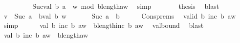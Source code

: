 \begin{isabellebody}
\ \ \ \ \isamarkupfalse%
\ \isamarkupfalse%
\ {\isachardoublequoteopen}{\isachardot}{\kern0pt}{\isachardot}{\kern0pt}{\isachardot}{\kern0pt}\ {\isacharequal}{\kern0pt}\ Suc{\isacharparenleft}{\kern0pt}val\ b\ {\isacharparenleft}{\kern0pt}a\ {\isacharhash}{\kern0pt}\ w{\isacharparenright}{\kern0pt}{\isacharparenright}{\kern0pt}\ mod\ {\isacharparenleft}{\kern0pt}b{\isacharcircum}{\kern0pt}length{\isacharparenleft}{\kern0pt}a{\isacharhash}{\kern0pt}w{\isacharparenright}{\kern0pt}{\isacharparenright}{\kern0pt}{\isachardoublequoteclose}\ \isamarkupfalse%
\ simp\isanewline
\ \ \ \ \isamarkupfalse%
\ \isamarkupfalse%
\ {\isacharquery}{\kern0pt}thesis\ \isamarkupfalse%
\ blast\isanewline
\ \ \isamarkupfalse%
\isanewline
\ \ \ \ \isamarkupfalse%
\ {\isacharquery}{\kern0pt}v\ {\isacharequal}{\kern0pt}\ {\isachardoublequoteopen}Suc\ a\ {\isacharplus}{\kern0pt}\ b{\isacharasterisk}{\kern0pt}val\ b\ w{\isachardoublequoteclose}\isanewline
\ \ \ \ \isamarkupfalse%
\ {}{\isacharcolon}{\kern0pt}\ {\isachardoublequoteopen}Suc\ a\ {\isasymnoteq}\ b{\isachardoublequoteclose}\isanewline
\ \ \ \ \isamarkupfalse%
\ Cons{\isachardot}{\kern0pt}prems\ \isamarkupfalse%
\ {\isachardoublequoteopen}valid\ b\ {\isacharparenleft}{\kern0pt}inc\ b\ {\isacharparenleft}{\kern0pt}a{\isacharhash}{\kern0pt}w{\isacharparenright}{\kern0pt}{\isacharparenright}{\kern0pt}{\isachardoublequoteclose}\ \isamarkupfalse%
\ simp\isanewline
\ \ \ \ \isamarkupfalse%
\ {\isachardoublequoteopen}val\ b\ {\isacharparenleft}{\kern0pt}inc\ b\ {\isacharparenleft}{\kern0pt}a{\isacharhash}{\kern0pt}w{\isacharparenright}{\kern0pt}{\isacharparenright}{\kern0pt}\ {\isacharless}{\kern0pt}\ b{\isacharcircum}{\kern0pt}length{\isacharparenleft}{\kern0pt}inc\ b\ {\isacharparenleft}{\kern0pt}a{\isacharhash}{\kern0pt}w{\isacharparenright}{\kern0pt}{\isacharparenright}{\kern0pt}{\isachardoublequoteclose}\ \isamarkupfalse%
\ val{\isacharunderscore}{\kern0pt}bound\ \isamarkupfalse%
\ blast\isanewline
\ \ \ \ \isamarkupfalse%
\ {\isachardoublequoteopen}val\ b\ {\isacharparenleft}{\kern0pt}inc\ b\ {\isacharparenleft}{\kern0pt}a{\isacharhash}{\kern0pt}w{\isacharparenright}{\kern0pt}{\isacharparenright}{\kern0pt}\ {\isacharless}{\kern0pt}\ b{\isacharcircum}{\kern0pt}length{\isacharparenleft}{\kern0pt}a{\isacharhash}{\kern0pt}w{\isacharparenright}{\kern0pt}{\isachardoublequoteclose}\ \isamarkupfalse%

\end{isabellebody}
